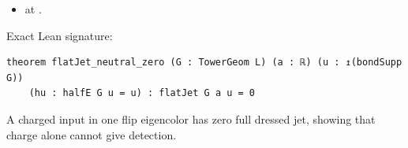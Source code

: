 \begin{theorem}[bp-331]
\begin{itemize}
\item \texttt{} at \texttt{}.
\end{itemize}
\par Exact Lean signature:
\begin{verbatim}
theorem flatJet_neutral_zero (G : TowerGeom L) (a : ℝ) (u : ↥(bondSupp G))
    (hu : halfE G u = u) : flatJet G a u = 0
\end{verbatim}
\end{theorem}

\begin{theorem}[bp-332]
\label{bp-332}
\uses{}
\leanok
A charged input in one flip eigencolor has zero full dressed jet, showing that charge alone cannot give detection.


\end{theorem}
